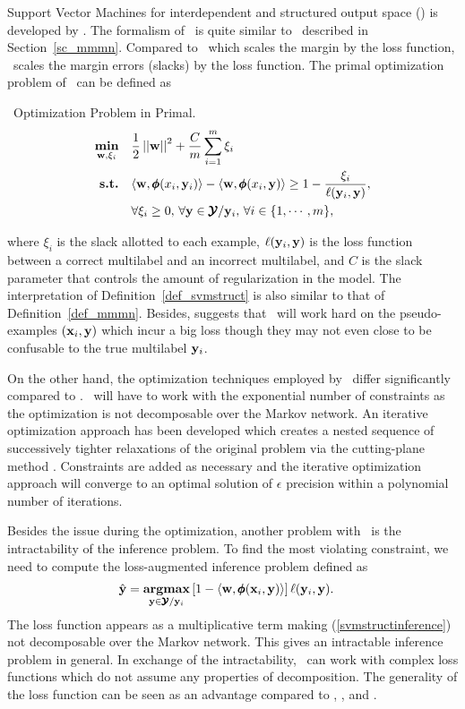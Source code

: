 {Support Vector Machines for interdependent and structured output space (\svmstruct) is developed by \citet{THJA04,TJTA05}.
The formalism of \svmstruct\ is quite similar to \mmmn\ described in Section~\ref{sc_mmmn}.
Compared to \mmmn\ which scales the margin by the loss function, \svmstruct\ scales the margin errors ({slacks}) by the loss function.
The primal optimization problem of \svmstruct\ can be defined as
\begin{definition}{\svmstruct\ Optimization Problem in Primal.}\label{def_svmstruct}
	\begin{align*}
		\underset{\mathbf {w},\xi_i}{\textbf{min}} & \quad\frac{1}{2}\left|\left| \mathbf {w} \right|\right|^2 + \frac{C}{m}\sum_{i=1}^{m}\xi_i \\
		\textbf{s.t.} & \quad\langle \mathbf {w}, \pmb \phi(x_i,\mathbf {y}_i) \rangle - \langle \mathbf {w}, \pmb \phi(x_i,\mathbf {y}) \rangle \ge 1-\frac{\xi_i}{\mathbf {\ell}(\mathbf {y}_i,\mathbf {y})},\\
		& \quad \forall \xi_i\ge0,\, \forall \mathbf {y}\in\pmb {\mathcal{Y}}/\mathbf {y}_i,\, \forall i\in\{1,\cdots,m\},
	\end{align*}
\end{definition}
\noindent
where $\xi_i$ is the slack allotted to each example, $\mathbf {\ell}(\mathbf {y}_i,\mathbf {y})$ is the loss function between a correct multilabel and an incorrect multilabel, and $C$ is the slack parameter that controls the amount of regularization in the model.
The interpretation of Definition~\ref{def_svmstruct} is also similar to that of Definition~\ref{def_mmmn}.
Besides, \citet{THJA04} suggests that \mmmn\ will work hard on the pseudo-examples $(\mathbf {x}_i,\mathbf {y})$ which incur a big loss though they may not even close to be confusable to the true multilabel $\mathbf {y}_i$.

On the other hand, the optimization techniques employed by \svmstruct\ differ significantly compared to \mmmn.
\svmstruct\ will have to work with the exponential number of constraints as the optimization is not decomposable over the Markov network.
An iterative optimization approach \citep{THJA04} has been developed which creates a nested sequence of successively tighter relaxations of the original problem via the cutting-plane method \citep{Bishop07,JFY09}.
Constraints are added as necessary and the iterative optimization approach will converge to an optimal solution of $\epsilon$ precision within a polynomial number of iterations.

Besides the issue during the optimization, another problem with \svmstruct\ is the intractability of the inference problem.
To find the most violating constraint, we need to compute the loss-augmented inference problem \citep{TJTA05} defined as
\begin{align}
	\hat{\mathbf {y}} = \underset{\mathbf {y}\in\pmb {\mathcal{Y}}/\mathbf {y}_i}{\textbf{argmax}} &\, [1-\langle \mathbf {w}, \pmb \phi(\mathbf {x}_i,\mathbf {y}) \rangle]\,\mathbf {\ell}(\mathbf {y}_i,\mathbf {y}). \label{svmstructinference}
\end{align}
The loss function appears as a multiplicative term making (\ref{svmstructinference}) not decomposable over the Markov network.
This gives an intractable inference problem in general.
In exchange of the intractability, \svmstruct\ can work with complex loss functions which do not assume any properties of decomposition.
The generality of the loss function can be seen as an advantage compared to \crf, \mmmn, and \mmcrf.



}
